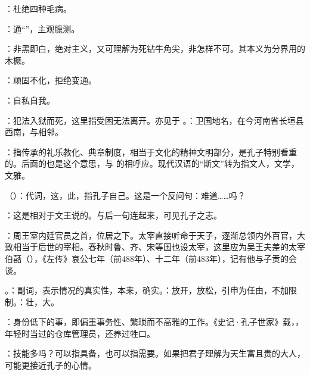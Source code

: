 {
\item {}：杜绝四种毛病。
\item {}：通“”，主观臆测。
\item {}：非黑即白，绝对主义，又可理解为死钻牛角尖，非怎样不可。其本义为分界用的木橛。%
\item {}：顽固不化，拒绝变通。
\item {}：自私自我。
}
{}


{
\item {}：犯法入狱而死，这里指受困无法离开。亦见于 。：卫国地名，在今河南省长垣县西南，与相邻。%
\item {}：指传承的礼乐教化、典章制度，相当于文化的精神文明部分，是孔子特别看重的。后面的也是这个意思，与  的相呼应。现代汉语的“斯文”转为指文人，文学，文雅。
\item {}（）：代词，这，此，指孔子自己。这是一个反问句：难道……吗？
\item {}：这是相对于文王说的。与后一句连起来，可见孔子之志。
}
{}


{
\item {}：周王室内廷官员之首，位居之下。太宰直接听命于天子，逐渐总领内外百官，大致相当于后世的宰相。春秋时鲁、齐、宋等国也设太宰，这里应为吴王夫差的太宰伯嚭（），《左传》哀公七年（前488年）、十二年（前483年），记有他与子贡的会谈。
\item {}。：副词，表示情况的真实性，本来，确实。：放开，放松，引申为任由，不加限制。：壮，大。
\item {}：身份低下的事，即偏重事务性、繁琐而不高雅的工作。《史记·孔子世家》载，，年轻时当过的仓库管理员，还养过牲口。
\item {}：技能多吗？可以指具备，也可以指需要。如果把君子理解为天生富且贵的大人，可能更接近孔子的心情。
}
{}


